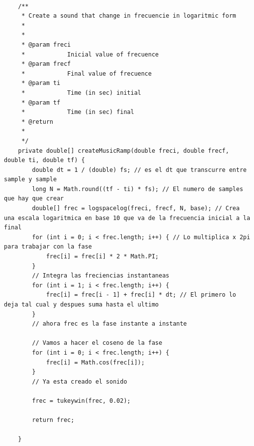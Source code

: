 \documentclass{article}
\begin{document}
    \begin{minipage}{\textwidth}
    \begin{lstlisting}[caption=Código que genera una rampa de frecuencia que varia en forma continua. Cada una de estas rampas es la representación sonora equivalente a un segmento recto en la lógica del vOICe pero preservando la continuidad de la señal al cambiar en forma continua la frecuencia como se observa en la figura \ref{fig:rampaFrec}., label=code:rampa]
    
    /**
	 * Create a sound that change in frecuencie in logaritmic form
	 * 
	 * 
	 * @param freci
	 *            Inicial value of frecuence
	 * @param frecf
	 *            Final value of frecuence
	 * @param ti
	 *            Time (in sec) initial
	 * @param tf
	 *            Time (in sec) final
	 * @return
	 * 
	 */
	private double[] createMusicRamp(double freci, double frecf, double ti, double tf) {
		double dt = 1 / (double) fs; // es el dt que transcurre entre sample y sample
		long N = Math.round((tf - ti) * fs); // El numero de samples que hay que crear
		double[] frec = logspacelog(freci, frecf, N, base); // Crea una escala logaritmica en base 10 que va de la frecuencia inicial a la final
		for (int i = 0; i < frec.length; i++) { // Lo multiplica x 2pi para trabajar con la fase
			frec[i] = frec[i] * 2 * Math.PI;
		}
		// Integra las freciencias instantaneas
		for (int i = 1; i < frec.length; i++) {
			frec[i] = frec[i - 1] + frec[i] * dt; // El primero lo deja tal cual y despues suma hasta el ultimo
		}
		// ahora frec es la fase instante a instante

		// Vamos a hacer el coseno de la fase
		for (int i = 0; i < frec.length; i++) {
			frec[i] = Math.cos(frec[i]);
		}
		// Ya esta creado el sonido

		frec = tukeywin(frec, 0.02);

		return frec;

	}
	\end{lstlisting}
    \end{minipage}

	
\end{document}

